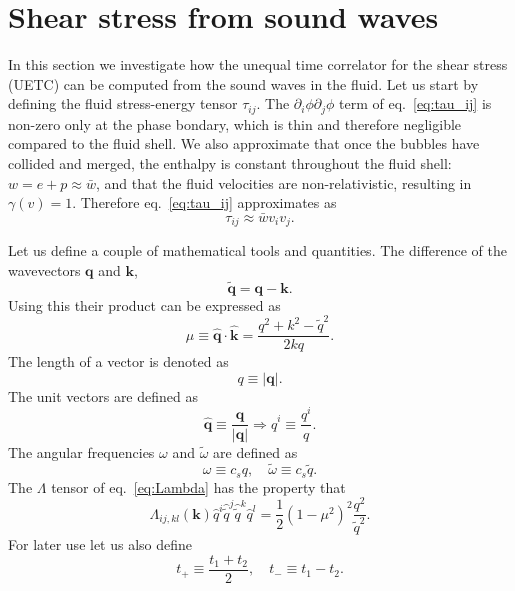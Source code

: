 \section{Shear stress from sound waves}
\label{shear_stress}
In this section we investigate how the unequal time correlator for the shear stress (UETC) can be computed from the sound waves in the fluid.
Let us start by defining the fluid stress-energy tensor $\tau_{ij}$.
The $\partial_i \phi \partial_j \phi$ term of eq.~\eqref{eq:tau_ij} is non-zero only at the phase bondary,
which is thin and therefore negligible compared to the fluid shell.
We also approximate that once the bubbles have collided and merged,
the enthalpy is constant throughout the fluid shell: $w = e + p \approx \bar{w}$,
and that the fluid velocities are non-relativistic, resulting in $\gamma(v) = 1$.
Therefore eq.~\eqref{eq:tau_ij} approximates as
\cite[eq. 3.12]{hindmarsh_gw_pt_2019}
\begin{equation}
\tau_{ij} \approx \bar{w} v_i v_j.
\label{eq:tau_ij_approx}
\end{equation}

Let us define a couple of mathematical tools and quantities.
The difference of the wavevectors $\mathbf{q}$ and $\mathbf{k}$,
\begin{equation}
\tilde{\mathbf{q}} = \mathbf{q} - \mathbf{k}.
\label{eq:tilde_q}
\end{equation}
Using this their product can be expressed as
\begin{equation}
\mu \equiv \hat{\mathbf{q}} \cdot \hat{\mathbf{k}} = \frac{q^2 + k^2 - \tilde{q}^2}{2kq}.
\label{eq:mu_ssm}
\end{equation}
The length of a vector is denoted as
\begin{equation}
q \equiv |\mathbf{q}|.
\end{equation}
The unit vectors are defined as
\begin{equation}
\hat{\mathbf{q}} \equiv \frac{\mathbf{q}}{|\mathbf{q}|} \Rightarrow
\hat{q}^i \equiv \frac{q^i}{q}.
\end{equation}
The angular frequencies $\omega$ and $\tilde{\omega}$ are defined as
\cite[p. 10]{hindmarsh_gw_pt_2019}
\begin{equation}
\omega \equiv c_s q, \quad \tilde{\omega} \equiv c_s \tilde{q}.
\end{equation}
The $\Lambda$ tensor of eq.~\eqref{eq:Lambda} has the property that
\cite[eq. 3.17]{hindmarsh_gw_pt_2019}
\begin{equation}
\Lambda_{ij,kl}(\mathbf{k}) \hat{q}^i \hat{\tilde{q}}^j \hat{\tilde{q}}^k \hat{q}^l = \frac{1}{2}(1 - \mu^2)^2 \frac{q^2}{\tilde{q}^2}.
\end{equation}
For later use let us also define
\cite[p. 11]{hindmarsh_gw_pt_2019}
\begin{equation}
t_+ \equiv \frac{t_1 + t_2}{2}, \quad t_- \equiv t_1 - t_2.
\label{eq:t_plus_minus}
\end{equation}

